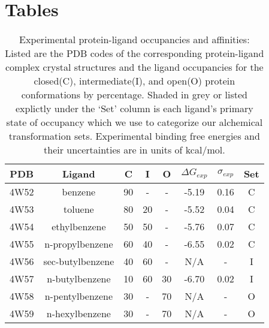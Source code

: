 \section*{Tables}

\begin{table}[!htb]
\centering
\caption{Experimental protein-ligand occupancies and affinities: 
Listed are the PDB codes of the corresponding protein-ligand complex crystal structures and the ligand occupancies\cite{Merski2015} for the closed(C), intermediate(I), and open(O) protein conformations by percentage. 
Shaded in grey or listed explictly under the `Set' column is each ligand's primary state of occupancy which we use to categorize our alchemical transformation sets. 
Experimental binding free energies and their uncertainties are in units of kcal/mol\cite{T4affinity}.
}
\label{tbl:expdata}
\begin{tabular}{|c|c|c|c|c|c|c|c|}
\hline
\textbf{PDB}  & \textbf{Ligand} & \textbf{C} & \textbf{I} & \textbf{O} & \boldmath$\Delta G_{exp}$  & \boldmath$\sigma_{exp}$ &  \textbf{Set} \\ \hline
4W52   &  benzene          & \cellcolor[HTML]{C0C0C0}90   & -     & -    & -5.19      & 0.16       &  C             \\ \hline
4W53   &  toluene          & \cellcolor[HTML]{C0C0C0}80   & 20   & -    & -5.52      & 0.04       & C   \\ \hline
4W54   &  ethylbenzene     & \cellcolor[HTML]{C0C0C0}50    & 50   & -    & -5.76      & 0.07       & C   \\ \hline
4W55   &  n-propylbenzene  & \cellcolor[HTML]{C0C0C0}60    & 40   & -    & -6.55      & 0.02       & C   \\ \hline
4W56   &  sec-butylbenzene & 40        & \cellcolor[HTML]{C0C0C0}60      & -    & N/A      & -     &  I   \\ \hline
4W57   &  n-butylbenzene   & 10        & \cellcolor[HTML]{C0C0C0}60      & 30   & -6.70   & 0.02  &  I   \\ \hline
4W58   &  n-pentylbenzene  & 30        &  -       & \cellcolor[HTML]{C0C0C0}70  & N/A     & -      &  O   \\ \hline
4W59   &  n-hexylbenzene   & 30        &  -       & \cellcolor[HTML]{C0C0C0}70  & N/A     & -     & O   \\ \hline
\end{tabular}
\end{table}


